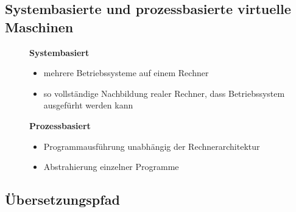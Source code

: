 \documentclass[12pt]{report}
\begin{document}
\subsection{Systembasierte und prozessbasierte virtuelle Maschinen}
\begin{figure}[H]
  \begin{minipage}[t]{0.45\textwidth}
    \begin{center}
      \textbf{Systembasiert}
    \end{center}
    \begin{itemize}
      \item mehrere Betriebssysteme auf einem Rechner
      \item so vollständige Nachbildung realer Rechner, dass Betriebssystem ausgefürht werden kann
    \end{itemize}
  \end{minipage}
  \hfill
  \begin{minipage}[t]{0.45\textwidth}
    \begin{center}
      \textbf{Prozessbasiert}
    \end{center}
    \begin{itemize}
      \item Programmausführung unabhängig der Rechnerarchitektur
      \item Abstrahierung einzelner Programme
    \end{itemize}
  \end{minipage}
\end{figure}

\subsection{Übersetzungspfad}
\end{document}
